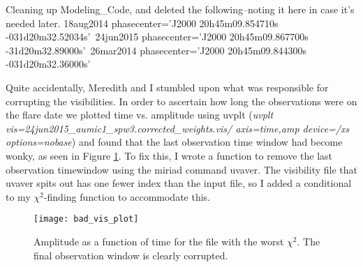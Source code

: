\documentclass[a4paper]{tufte-handout}
\begin{document}

Cleaning up Modeling\_Code, and deleted the following--noting it here in case it's needed later.
\noindent 18aug2014 phasecenter='J2000 20h45m09.854710s -031d20m32.52034s'\
24jun2015 phasecenter='J2000 20h45m09.867700s -31d20m32.89000s'\
26mar2014 phasecenter='J2000 20h45m09.844300s -031d20m32.36000s'\


\hrulefill


Quite accidentally, Meredith and I stumbled upon what was responsible for corrupting the visibilities. In order to ascertain how long the observations were on the flare date we plotted time vs. amplitude using uvplt (\textit{uvplt vis=24jun2015\_aumic1\_spw3.corrected\_weights.vis/ axis=time,amp device=/xs options=nobase}) and found that the last observation time window had become wonky, as seen in Figure \ref{fig:bad_vis}. To fix this, I wrote a function to remove the last observation timewindow using the miriad command uvaver. The visibility file that uvaver spits out has one fewer index than the input file, so I added a conditional to my $\chi^2$-finding function to accommodate this.

\begin{figure}[!ht]
  \label{fig:bad_vis}
  \centering
  \caption{Amplitude as a function of time for the file with the worst $\chi^2$. The final observation window is clearly corrupted.}

  \texttt{[image: bad\_vis\_plot]}
\end{figure}


\hrulefill

\end{document}
